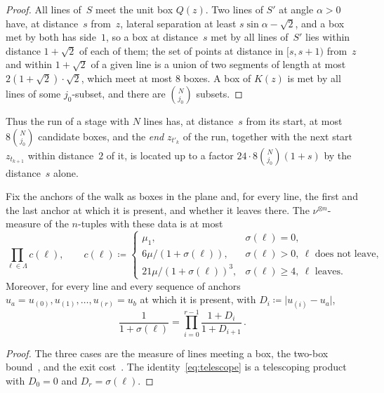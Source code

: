 \documentclass[11pt,letterpaper]{article}
\begin{document}
\begin{proof}
All lines of~$S$ meet the unit box $Q(z)$. Two lines of $S'$ at angle $\alpha>0$ have, at distance~$s$ from~$z$, lateral separation at least $s\sin\alpha-\sqrt2$, and a box met by both has side~$1$, so a box at distance~$s$ met by all lines of~$S'$ lies within distance $1+\sqrt2$ of each of them; the set of points at distance in $[s,s+1)$ from~$z$ and within $1+\sqrt2$ of a given line is a union of two segments of length at most~$2(1+\sqrt2)\cdot\sqrt2$, which meet at most $8$ boxes. A box of $K(z)$ is met by all lines of some $j_0$-subset, and there are $\binom N{j_0}$ subsets.
\end{proof}

Thus the run of a stage with $N$ lines has, at distance~$s$ from its start, at most $8\binom N{j_0}$ candidate boxes, and the \emph{end} $z_{t'_k}$ of the run, together with the next start $z_{t_{k+1}}$ within distance~$2$ of it, is located up to a factor $24\cdot8\binom N{j_0}(1+s)$ by the distance~$s$ alone.

\begin{lemma}
\label{lem:measure}
Fix the anchors of the walk as boxes in the plane and, for every line, the first and the last anchor at which it is present, and whether it leaves there. The $\nu^{\otimes n}$-measure of the $n$-tuples with these data is at most
\begin{equation}
\label{eq:cost}
  \prod_{\ell\in\Lambda}c(\ell),\qquad
  c(\ell)\coloneqq\begin{cases}\mu_1,&\sigma(\ell)=0,\\[2pt] 6\mu/(1+\sigma(\ell)),&\sigma(\ell)>0,\ \ell\text{ does not leave},\\[2pt] 21\mu/(1+\sigma(\ell))^3,&\sigma(\ell)\ge4,\ \ell\text{ leaves}.\end{cases}
\end{equation}
Moreover, for every line and every sequence of anchors $u_a=u_{(0)},u_{(1)},\dots,u_{(r)}=u_b$ at which it is present, with $D_i\coloneqq\lvert u_{(i)}-u_a\rvert$,
\begin{equation}
\label{eq:telescope}
  \frac1{1+\sigma(\ell)}=\prod_{i=0}^{r-1}\frac{1+D_i}{1+D_{i+1}}\,.
\end{equation}
\end{lemma}

\begin{proof}
The three cases are the measure of lines meeting a box, the two-box bound~\cite[Lemma~3.2]{HJ26b}, and the exit cost~\cite[Lemma~7.2]{DEC26}. The identity~\eqref{eq:telescope} is a telescoping product with $D_0=0$ and $D_r=\sigma(\ell)$.
\end{proof}
\end{document}
